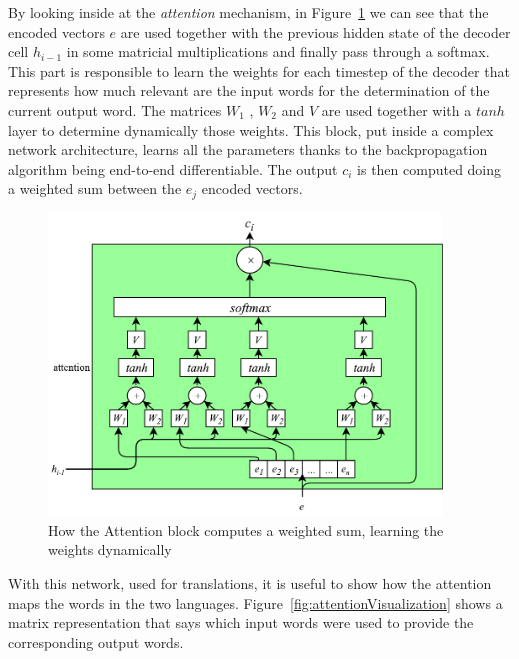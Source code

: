 By looking inside at the \textit{attention} mechanism, in Figure~\ref{fig:attention} we can see that the encoded vectors  \( e \)  are used together with the previous hidden state of the decoder cell  \( h_{i-1} \) in some matricial multiplications and finally pass through a softmax. This part is responsible to learn the weights for each timestep of the decoder that represents how much relevant are the input words for the determination of the current output word. The matrices  \( W_{1} \) , \( W_{2} \)  and  \( V \) are used together with a  \( tanh \)  layer to determine dynamically those weights. This block, put inside a complex network architecture, learns all the parameters thanks to the backpropagation algorithm being end-to-end differentiable. The output  \( c_{i} \)  is then computed doing a weighted sum between the  \( e_{j} \)  encoded vectors.

\begin{figure}[!htbp]
    \centering
    \includegraphics[max width=\linewidth,max height=8cm,keepaspectratio]{figures/attention}
    \caption{How the Attention block computes a weighted sum, learning the weights dynamically}\label{fig:attention}
\end{figure}

With this network, used for translations, it is useful to show how the attention maps the words in the two languages. Figure~\ref{fig:attentionVisualization} shows a matrix representation that says which input words were used to provide the corresponding output words.

